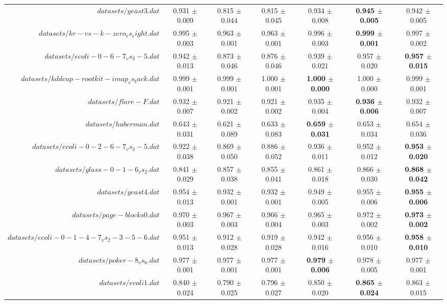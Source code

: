 \begin{table}[!ht]
{\begin{tabular}{r c c c c c c}
$datasets/yeast3.dat$ & 0.931 $\pm$ 0.009 & 0.815 $\pm$ 0.044 & 0.815 $\pm$ 0.045 & 0.934 $\pm$ 0.008 & \textbf{0.945 $\pm$ 0.005} & 0.942 $\pm$ 0.005 \\
$datasets/kr-vs-k-zero_vs_eight.dat$ & 0.995 $\pm$ 0.003 & 0.963 $\pm$ 0.001 & 0.963 $\pm$ 0.001 & 0.996 $\pm$ 0.003 & \textbf{0.999 $\pm$ 0.001} & 0.997 $\pm$ 0.002 \\
$datasets/ecoli-0-6-7_vs_3-5.dat$ & 0.942 $\pm$ 0.013 & 0.873 $\pm$ 0.046 & 0.876 $\pm$ 0.046 & 0.939 $\pm$ 0.021 & 0.957 $\pm$ 0.020 & \textbf{0.957 $\pm$ 0.015} \\
$datasets/kddcup-rootkit-imap_vs_back.dat$ & 0.999 $\pm$ 0.001 & 0.999 $\pm$ 0.001 & 1.000 $\pm$ 0.001 & \textbf{1.000 $\pm$ 0.000} & 1.000 $\pm$ 0.000 & 0.999 $\pm$ 0.001 \\
$datasets/flare-F.dat$ & 0.932 $\pm$ 0.007 & 0.921 $\pm$ 0.002 & 0.921 $\pm$ 0.002 & 0.935 $\pm$ 0.004 & \textbf{0.936 $\pm$ 0.006} & 0.932 $\pm$ 0.007 \\
$datasets/haberman.dat$ & 0.643 $\pm$ 0.031 & 0.621 $\pm$ 0.089 & 0.633 $\pm$ 0.083 & \textbf{0.659 $\pm$ 0.031} & 0.653 $\pm$ 0.034 & 0.654 $\pm$ 0.036 \\
$datasets/ecoli-0-2-6-7_vs_3-5.dat$ & 0.922 $\pm$ 0.038 & 0.869 $\pm$ 0.050 & 0.886 $\pm$ 0.052 & 0.936 $\pm$ 0.011 & 0.952 $\pm$ 0.012 & \textbf{0.953 $\pm$ 0.020} \\
$datasets/glass-0-1-6_vs_2.dat$ & 0.841 $\pm$ 0.029 & 0.857 $\pm$ 0.038 & 0.855 $\pm$ 0.041 & 0.861 $\pm$ 0.018 & 0.866 $\pm$ 0.030 & \textbf{0.868 $\pm$ 0.042} \\
$datasets/yeast4.dat$ & 0.954 $\pm$ 0.013 & 0.932 $\pm$ 0.001 & 0.932 $\pm$ 0.001 & 0.949 $\pm$ 0.005 & 0.955 $\pm$ 0.006 & \textbf{0.955 $\pm$ 0.006} \\
$datasets/page-blocks0.dat$ & 0.970 $\pm$ 0.003 & 0.967 $\pm$ 0.003 & 0.966 $\pm$ 0.004 & 0.965 $\pm$ 0.003 & 0.972 $\pm$ 0.002 & \textbf{0.973 $\pm$ 0.002} \\
$datasets/ecoli-0-1-4-7_vs_2-3-5-6.dat$ & 0.951 $\pm$ 0.013 & 0.912 $\pm$ 0.028 & 0.919 $\pm$ 0.028 & 0.942 $\pm$ 0.016 & 0.956 $\pm$ 0.010 & \textbf{0.958 $\pm$ 0.010} \\
$datasets/poker-8_vs_6.dat$ & 0.977 $\pm$ 0.001 & 0.977 $\pm$ 0.001 & 0.977 $\pm$ 0.001 & \textbf{0.979 $\pm$ 0.006} & 0.978 $\pm$ 0.005 & 0.977 $\pm$ 0.001 \\
$datasets/ecoli1.dat$ & 0.840 $\pm$ 0.024 & 0.790 $\pm$ 0.025 & 0.796 $\pm$ 0.027 & 0.850 $\pm$ 0.020 & \textbf{0.865 $\pm$ 0.024} & 0.863 $\pm$ 0.015 \\

\end{tabular}}
\end{table}
